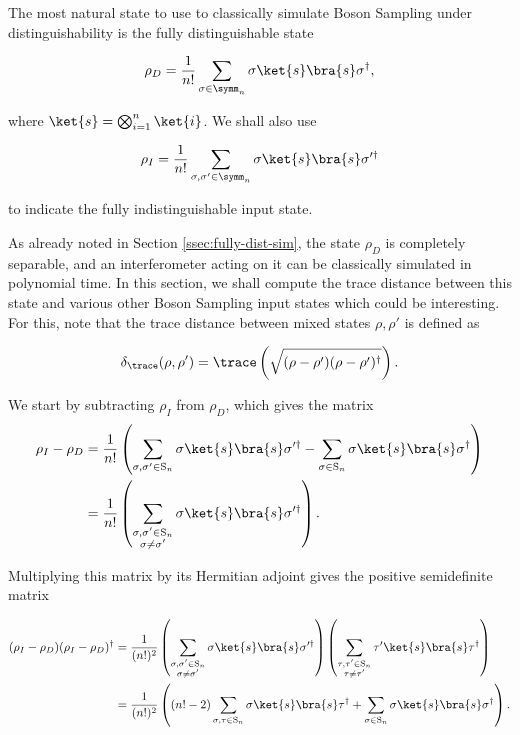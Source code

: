 The most natural state to use to classically simulate Boson Sampling under distinguishability is the fully distinguishable state

\begin{equation}
\rho_D = \frac{1}{n!}\sum_{\sigma\in\symm_n}\sigma\ket{s}\bra{s}\sigma^\dagger,
\end{equation}

\noindent where $\ket{s} = \bigotimes_{i=1}^n\ket{i}$. We shall also use 

\begin{equation}
\rho_I = \frac{1}{n!}\sum_{\sigma, \sigma' \in \symm_n}\sigma\ket{s}\bra{s}\sigma'^\dagger
\end{equation}

\noindent to indicate the fully indistinguishable input state.

As already noted in Section \ref{ssec:fully-dist-sim}, the state $\rho_D$ is completely separable, and an interferometer acting on it can be classically simulated in polynomial time. In this section, we shall compute the trace distance between this state and various other Boson Sampling input states which could be interesting. For this, note that the trace distance between mixed states $\rho, \rho'$ is defined as

\begin{equation}
\delta_{\trace}
(\rho, \rho') = \trace\left(\sqrt{(\rho - \rho')(\rho-\rho')^\dagger}\right).
\end{equation}

We start by subtracting $\rho_I$ from $\rho_D$, which gives the matrix\begin{align}
\rho_I - \rho_D &= \frac{1}{n!}\left(\sum_{\sigma,\sigma'\in\textrm{S}_n}\sigma\ket{s}\bra{s}\sigma'^\dagger - \sum_{\sigma \in \textrm{S}_n}\sigma\ket{s}\bra{s}\sigma^\dagger\right)\\
&= \frac{1}{n!}\left(\sum_{\substack{\sigma,\sigma'\in\textrm{S}_n\\\sigma\neq\sigma'}}\sigma\ket{s}\bra{s}\sigma'^\dagger\right).
\end{align}

\noindent Multiplying this matrix by its Hermitian adjoint gives the positive semidefinite matrix

\begin{align}
(\rho_I - \rho_D)(\rho_I - \rho_D)^\dagger &= \frac{1}{(n!)^2}\left(\sum_{\substack{\sigma,\sigma'\in\textrm{S}_n\\\sigma\neq\sigma'}}\sigma\ket{s}\bra{s}\sigma'^\dagger\right)\left(\sum_{\substack{\tau,\tau'\in\textrm{S}_n\\\tau\neq\tau'}}\tau'\ket{s}\bra{s}\tau^\dagger\right)\\
&= \frac{1}{(n!)^2}\left((n! - 2)\sum_{\sigma,\tau\in\textrm{S}_n}\sigma\ket{s}\bra{s}\tau^\dagger + \sum_{\sigma \in \textrm{S}_n}\sigma\ket{s}\bra{s}\sigma^\dagger\right).
\end{align}

